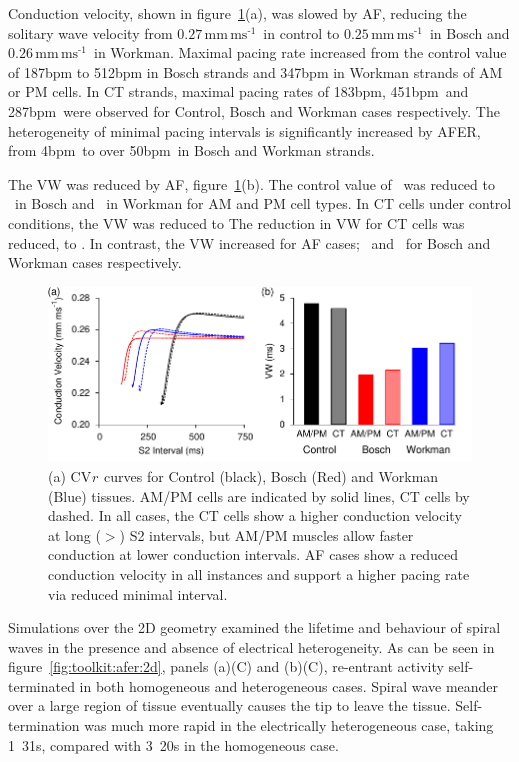 Conduction velocity, shown in figure~\ref{fig:toolkit:afer:cvr}(a), was slowed by AF,
reducing the solitary wave velocity from $0.27\,\text{mm}\,\text{ms}^{\text{-1}}$\ in
control to $0.25\,\text{mm}\,\text{ms}^{\text{-1}}$\ in Bosch and
$0.26\,\text{mm}\,\text{ms}^{\text{-1}}$\ in
Workman.
Maximal pacing rate increased from the control value of \unit{187}{bpm} to
\unit{512}{bpm} in Bosch strands and \unit{347}{bpm} in Workman strands of AM or
PM cells.
In CT strands, maximal pacing rates of \unit{183}{bpm}, \unit{451}{bpm}\ and
\unit{287}{bpm}\ were observed for Control, Bosch and Workman cases
respectively.
The heterogeneity of minimal pacing intervals is significantly increased by
AFER, from \unit{4}{bpm}\ to over \unit{50}{bpm}\ in Bosch and Workman strands.

The VW was reduced by AF, figure~\ref{fig:toolkit:afer:cvr}(b).
The control value of \ was reduced to \ in Bosch and \ in Workman for AM and PM cell types.
In CT cells under control conditions, the VW was reduced to \ms{}
The reduction in VW for CT cells was reduced, to .
In contrast, the VW increased for AF cases; \ and \ for Bosch
and Workman cases respectively.


\begin{figure}
\centering
\includegraphics{figures/toolkit/afer/figures/03_CVR}
\caption[AFER CVr curves and VWs]{
\label{fig:toolkit:afer:cvr}
(a) 
CV\emph{r}\ curves for Control (black), Bosch (Red) and Workman (Blue) tissues.
AM/PM cells are indicated by solid lines, CT cells by dashed.
In all cases, the CT cells show a higher conduction velocity at long
($>$) S2 intervals, but AM/PM muscles allow faster conduction at lower
conduction intervals.
AF cases show a reduced conduction velocity in all instances and support a
higher pacing rate via reduced minimal interval.
}
\end{figure}

Simulations over the 2D geometry examined the lifetime and behaviour of
spiral waves in the presence and absence of electrical heterogeneity.
As can be seen in figure~\ref{fig:toolkit:afer:2d}, panels (a)(C) and (b)(C), re-entrant
activity self-terminated in both homogeneous and heterogeneous cases.
Spiral wave meander over a large region of tissue eventually causes the tip to
leave the tissue.
Self-termination was much more rapid in the electrically heterogeneous case,
taking \unit{1.31}{s}, compared with \unit{3.20}{s} in the homogeneous case.


